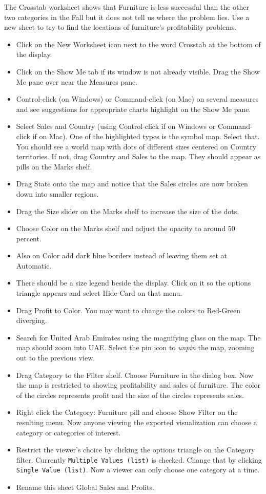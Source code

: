 The Crosstab worksheet shows that Furniture is less successful than the
other two categories in the Fall but it does not tell us where the
problem lies. Use a new sheet to try to find the locations of
furniture's profitability problems.

\begin{itemize}
\tightlist
\item
  Click on the New Worksheet icon next to the word Crosstab at the
  bottom of the display.
\item
  Click on the Show Me tab if its window is not already visible. Drag
  the Show Me pane over near the Measures pane.
\item
  Control-click (on Windows) or Command-click (on Mac) on several
  measures and see suggestions for appropriate charts highlight on the
  Show Me pane.
\item
  Select Sales and Country (using Control-click if on Windows or
  Command-click if on Mac). One of the highlighted types is the symbol
  map. Select that. You should see a world map with dots of different
  sizes centered on Country territories. If not, drag Country and Sales
  to the map. They should appear as pills on the Marks shelf.
\item
  Drag State onto the map and notice that the Sales circles are now
  broken down into smaller regions.
\item
  Drag the Size slider on the Marks shelf to increase the size of the
  dots.
\item
  Choose Color on the Marks shelf and adjust the opacity to around 50
  percent.
\item
  Also on Color add dark blue borders instead of leaving them set at
  Automatic.
\item
  There should be a size legend beside the display. Click on it so the
  options triangle appears and select Hide Card on that menu.
\item
  Drag Profit to Color. You may want to change the colors to Red-Green
  diverging.
\item
  Search for United Arab Emirates using the magnifying glass on the map.
  The map should zoom into UAE. Select the pin icon to \emph{unpin} the
  map, zooming out to the previous view.
\item
  Drag Category to the Filter shelf. Choose Furniture in the dialog box.
  Now the map is restricted to showing profitability and sales of
  furniture. The color of the circles represents profit and the size of
  the circles represents sales.
\item
  Right click the Category: Furniture pill and choose Show Filter on the
  resulting menu. Now anyone viewing the exported visualization can
  choose a category or categories of interest.
\item
  Restrict the viewer's choice by clicking the options triangle on the
  Category filter. Currently \texttt{Multiple\ Values\ (list)} is
  checked. Change that by clicking \texttt{Single\ Value\ (list)}. Now a
  viewer can only choose one category at a time.
\item
  Rename this sheet Global Sales and Profits.
\end{itemize}


